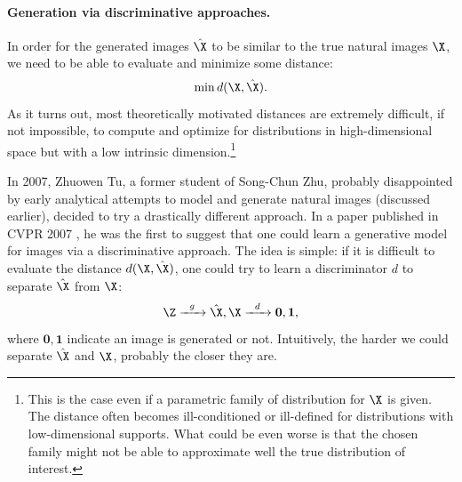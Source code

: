 \documentclass[../../book-main.tex]{subfiles}
\begin{document}
\paragraph{Generation via discriminative approaches.}
In order for the generated images $\hat \X$ to be similar to the true natural images $\X$, we need to be able to evaluate and minimize some distance:
\begin{equation}
    \min d(\X, \hat \X).
\end{equation}
As it turns out, most theoretically motivated  distances are extremely difficult, if not impossible, to compute and optimize for distributions in high-dimensional space but with a low intrinsic dimension.\footnote{This is the case even if a parametric family of distribution for $\X$ is given. The distance often becomes ill-conditioned or ill-defined for distributions with low-dimensional supports. What could be even worse is that the chosen family might not be able to approximate well the true distribution of interest.} 

In 2007, Zhuowen Tu, a former student of Song-Chun Zhu, probably disappointed by early analytical attempts to model and generate natural images (discussed earlier), decided to try a drastically different approach. In a paper published in CVPR 2007 \cite{Tu-2007}, he was the first to suggest that one could learn a generative model for images via a discriminative approach. The idea is simple: if it is difficult to evaluate the distance $d(\X, \hat \X)$, one could try to  learn a discriminator $d$ to separate $\hat \X$ from $\X$: 
\begin{equation}
    \Z   \xrightarrow{\hspace{2mm} g  \hspace{2mm}} \hat \X, \X \xrightarrow{\hspace{2mm} d  \hspace{2mm}} \boldsymbol{0}, \boldsymbol{1},
       \label{eqn:gan-networks}
\end{equation}
where $\boldsymbol{0}, \boldsymbol{1}$ indicate an image is generated or not.
Intuitively, the harder we could separate $\hat \X$ and   $\X$, probably the closer they are. 
\end{document}
